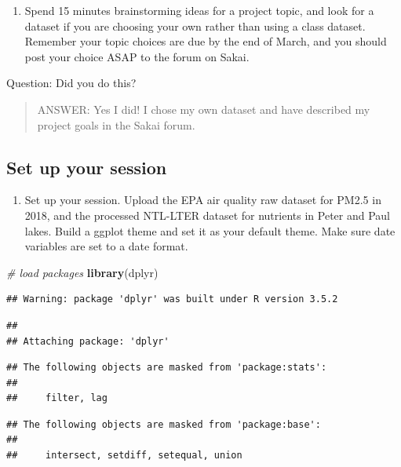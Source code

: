 \documentclass[]{article}
\newenvironment{Shaded}{\begin{snugshade}}{\end{snugshade}}
\newcommand{\KeywordTok}[1]{\textcolor[rgb]{0.13,0.29,0.53}{\textbf{#1}}}
\newcommand{\CommentTok}[1]{\textcolor[rgb]{0.56,0.35,0.01}{\textit{#1}}}
\newcommand{\NormalTok}[1]{#1}
\providecommand{\tightlist}{%
  \setlength{\itemsep}{0pt}\setlength{\parskip}{0pt}}
\begin{document}
\begin{enumerate}
\def\labelenumi{\arabic{enumi}.}
\tightlist
\item
  Spend 15 minutes brainstorming ideas for a project topic, and look for
  a dataset if you are choosing your own rather than using a class
  dataset. Remember your topic choices are due by the end of March, and
  you should post your choice ASAP to the forum on Sakai.
\end{enumerate}

Question: Did you do this?

\begin{quote}
ANSWER: Yes I did! I chose my own dataset and have described my project
goals in the Sakai forum.
\end{quote}

\subsection{Set up your session}\label{set-up-your-session}

\begin{enumerate}
\def\labelenumi{\arabic{enumi}.}
\setcounter{enumi}{1}
\tightlist
\item
  Set up your session. Upload the EPA air quality raw dataset for PM2.5
  in 2018, and the processed NTL-LTER dataset for nutrients in Peter and
  Paul lakes. Build a ggplot theme and set it as your default theme.
  Make sure date variables are set to a date format.
\end{enumerate}

\begin{Shaded}
\begin{Highlighting}[]
\CommentTok{# load packages}
\KeywordTok{library}\NormalTok{(dplyr)}
\end{Highlighting}
\end{Shaded}

\begin{verbatim}
## Warning: package 'dplyr' was built under R version 3.5.2
\end{verbatim}

\begin{verbatim}
## 
## Attaching package: 'dplyr'
\end{verbatim}

\begin{verbatim}
## The following objects are masked from 'package:stats':
## 
##     filter, lag
\end{verbatim}

\begin{verbatim}
## The following objects are masked from 'package:base':
## 
##     intersect, setdiff, setequal, union
\end{verbatim}
\end{document}
